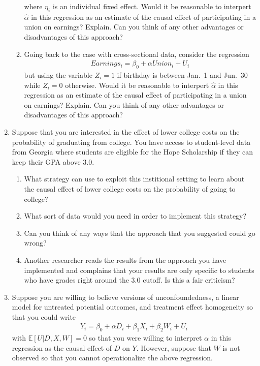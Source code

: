 \documentclass[
  letterpaper,
  DIV=11,
  numbers=noendperiod]{scrreprt}
\begin{document}
\begin{enumerate}
\begin{enumerate}
    where \(\eta_i\) is an individual fixed effect. Would it be
    reasonable to interpert \(\hat{\alpha}\) in this regression as an
    estimate of the causal effect of participating in a union on
    earnings? Explain. Can you think of any other advantages or
    disadvantages of this approach?
  \item
    Going back to the case with cross-sectional data, consider the
    regression \begin{align*}
       Earnings_i = \beta_0 + \alpha Union_i + U_i
     \end{align*} but using the variable \(Z_i = 1\) if birthday is
    between Jan.~1 and Jun.~30 while \(Z_i=0\) otherwise. Would it be
    reasonable to interpert \(\hat{\alpha}\) in this regression as an
    estimate of the causal effect of participating in a union on
    earnings? Explain. Can you think of any other advantages or
    disadvantages of this approach?
  \end{enumerate}
\item
  Suppose that you are interested in the effect of lower college costs
  on the probability of graduating from college. You have access to
  student-level data from Georgia where students are eligible for the
  Hope Scholarship if they can keep their GPA above 3.0.

  \begin{enumerate}
  \def\labelenumii{\alph{enumii})}
  \item
    What strategy can use to exploit this institional setting to learn
    about the causal effect of lower college costs on the probability of
    going to college?
  \item
    What sort of data would you need in order to implement this
    strategy?
  \item
    Can you think of any ways that the approach that you suggested could
    go wrong?
  \item
    Another researcher reads the results from the approach you have
    implemented and complains that your results are only specific to
    students who have grades right around the 3.0 cutoff. Is this a fair
    criticism?
  \end{enumerate}
\item
  Suppose you are willing to believe versions of unconfoundedness, a
  linear model for untreated potential outcomes, and treatment effect
  homogeneity so that you could write \begin{align*}
    Y_i = \beta_0 + \alpha D_i + \beta_1 X_i + \beta_2 W_i + U_i
  \end{align*} with \(\mathbb{E}[U|D,X,W] = 0\) so that you were willing
  to interpret \(\alpha\) in this regression as the causal effect of
  \(D\) on \(Y\). However, suppose that \(W\) is not observed so that
  you cannot operationalize the above regression.


\end{enumerate}
\end{document}
